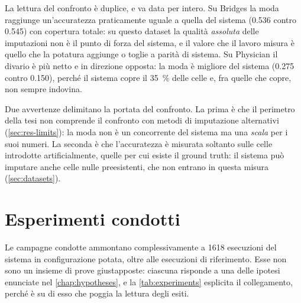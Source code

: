 La lettura del confronto è duplice, e va data per intero. Su Bridges la moda raggiunge
un'accuratezza praticamente uguale a quella del sistema (\num{0.536} contro \num{0.545}) con
copertura totale: su questo dataset la qualità \emph{assoluta} delle imputazioni non è il punto di
forza del sistema, e il valore che il lavoro misura è quello che la potatura aggiunge o toglie a
parità di sistema. Su Physician il divario è più netto e in direzione opposta: la moda è migliore
del sistema (\num{0.275} contro \num{0.150}), perché il sistema copre il \SI{35}{\percent} delle
celle e, fra quelle che copre, non sempre indovina.

Due avvertenze delimitano la portata del confronto. La prima è che il perimetro della tesi non
comprende il confronto con metodi di imputazione alternativi (\autoref{sec:res-limits}): la moda
non è un concorrente del sistema ma una \emph{scala} per i suoi numeri. La seconda è che
l'accuratezza è misurata soltanto sulle celle introdotte artificialmente, quelle per cui esiste il
ground truth: il sistema può imputare anche celle nulle preesistenti, che non entrano in questa
misura (\autoref{sec:datasets}).

\section{Esperimenti condotti}\label{sec:experiments}

Le campagne condotte ammontano complessivamente a \num{1618} esecuzioni del sistema in
configurazione potata, oltre alle esecuzioni di riferimento. Esse non sono un insieme di prove
giustapposte: ciascuna risponde a una delle ipotesi enunciate nel \autoref{chap:hypotheses}, e la
\autoref{tab:experiments} esplicita il collegamento, perché è su di esso che poggia la lettura
degli esiti.

